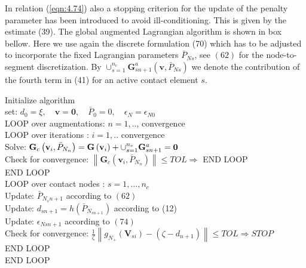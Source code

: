 In relation (\ref{eqn:4.74}) also a stopping criterion for the update of the penalty parameter has been introduced to avoid ill-conditioning. This is given by the estimate (39). The global augmented Lagrangian algorithm is shown in box bellow. Here we use again the discrete formulation (70) which has to be adjusted to incorporate the fixed Lagrangian parameters $ \bar{P}_{N s} $, see $ (62) $ for the node-to-segment discretization. By $ \cup_{s=1}^{n_{c}} \mathbf{G}_{s n+1}^{a}\left(\mathbf{v}, \bar{P}_{N s}\right) $ we denote the contribution of the fourth term in (41) for an active contact element $ s $.
\begin{framed}
    Initialize algorithm\\
    set: $ d_{0}=\xi, \quad \mathbf{v}=\mathbf{0}, \quad \bar{P}_{0}=0, \quad \epsilon_{N}=\epsilon_{N 0} $\\
LOOP over augmentations: $ n=1, . . $, convergence \\
\hspace*{6mm} LOOP over iterations : $ i=1, . . $  convergence\\
\hspace*{10mm} Solve: $ \mathbf{G}_{c}\left(\mathbf{v}_{i},\\ \bar{P}_{N_{n}}\right)=\mathbf{G}\left(\mathbf{v}_{i}\right)+\cup_{s=1}^{n_{c}} \mathbf{G}_{s n+1}^{a}=\mathbf{0} $\\
\hspace*{10mm} Check for convergence: $ \left\|\mathbf{G}_{c}\left(\mathbf{v}_{i}, \bar{P}_{N_{n}}\right)\right\| \leq T O L \Rightarrow $  END LOOP\\
\hspace*{6mm} END LOOP\\
\hspace*{6mm} LOOP over contact nodes : $s = 1,\dots, n_c$\\
\hspace*{10mm} Update: $\bar{P}_{N_{s} n+1}$ according to $(62)$ \\
\hspace*{10mm} Update: $d_{s n+1}=h\left(\bar{P}_{N_{s n+1}}\right)$ according to (12) \\
\hspace*{10mm} Update: $\epsilon_{N s n+1}$ according to $(74)$\\
\hspace*{10mm} Check for convergence: $ \frac{1}{\zeta}\left\|g_{N_{+}}\left(\mathbf{V}_{s i}\right)-\left(\zeta-d_{n+1}\right)\right\| \leq T O L \Rightarrow S T O P $\\
\hspace*{6mm} END LOOP\\
END LOOP \\ 
\end{framed}
